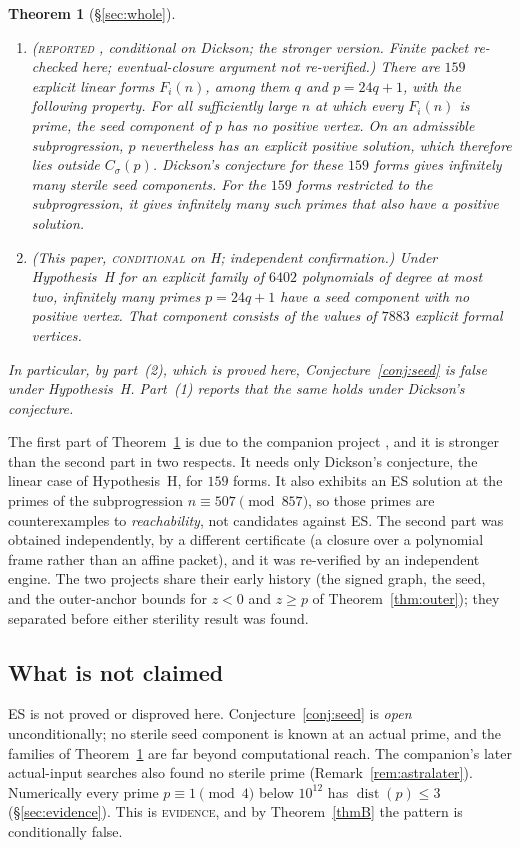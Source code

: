 \documentclass[11pt,reqno]{amsart}
\newtheorem{introthm}{Theorem}
\theoremstyle{definition}
\newcommand{\dist}{\operatorname{dist}}
\newcommand{\status}[1]{\textsc{#1}}
\begin{document}
\begin{introthm}[\S\ref{sec:whole}]\label{thmC}
\leavevmode
\begin{enumerate}
\item \emph{(\status{reported} \cite{AS}, conditional on Dickson; the
stronger version.  Finite packet re-checked here; eventual-closure argument
not re-verified.)}  There
are $159$ explicit linear forms $F_i(n)$, among them $q$ and $p=24q+1$, with
the following property.  For all sufficiently large $n$ at which every
$F_i(n)$ is prime, the seed component of $p$ has no positive vertex.  On an
admissible subprogression, $p$ nevertheless has an explicit positive
solution, which therefore lies outside $C_\sigma(p)$.  Dickson's conjecture
for these $159$ forms gives infinitely many sterile seed components.  For
the $159$ forms restricted to the subprogression, it gives infinitely many
such primes that also have a positive solution.
\item \emph{(This paper, \status{conditional} on H; independent
confirmation.)}  Under Hypothesis~H for
an explicit family of $6402$ polynomials of degree at most two, infinitely
many primes $p=24q+1$ have a seed component with no positive vertex.  That
component consists of the values of $7883$ explicit formal vertices.
\end{enumerate}
In particular, by part~(2), which is proved here, Conjecture~\ref{conj:seed}
is false under Hypothesis~H.  Part~(1) reports that the same holds under
Dickson's conjecture.
\end{introthm}

The first part of Theorem~\ref{thmC} is due to the companion project
\cite{AS}, and it is stronger than the second part in two respects.  It
needs only Dickson's conjecture, the linear case of Hypothesis~H, for $159$
forms.  It also exhibits an ES solution at the primes of the subprogression
$n\equiv507\pmod{857}$, so those primes are counterexamples to
\emph{reachability}, not candidates against ES.  The second part was
obtained independently, by a different certificate (a closure over a
polynomial frame rather than an affine packet), and it was re-verified by
an independent engine.  The two projects share their early history (the
signed graph, the seed, and the outer-anchor bounds for $z<0$ and $z\ge p$
of Theorem~\ref{thm:outer}); they separated before either sterility
result was found.

\subsection{What is not claimed}
ES is not proved or disproved here.  Conjecture~\ref{conj:seed} is
\emph{open} unconditionally; no sterile seed component is known at an actual
prime, and the families of Theorem~\ref{thmC} are far beyond computational
reach.  The companion's later actual-input searches also found no sterile
prime (Remark~\ref{rem:astralater}).  Numerically every prime $p\equiv1\pmod4$ below $10^{12}$ has
$\dist(p)\le3$ (\S\ref{sec:evidence}).  This is \status{evidence}, and by
Theorem~\ref{thmB} the pattern is conditionally false.
\end{document}
